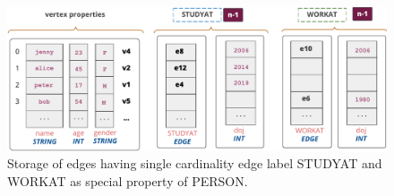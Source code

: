 
\begin{figure}
	\hfill\includegraphics[scale=0.78]{img/single-cardinality-cols}\hspace*{\fill}
	\captionsetup{justification=centering}
	\caption{Storage of edges having single cardinality edge label STUDYAT and WORKAT as special property of PERSON.}
	\label{fig:single-cardinality-cols}
\end{figure} 


